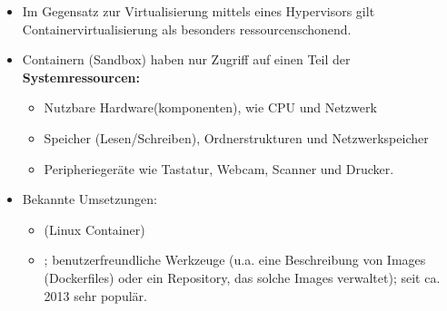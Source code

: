 \begin{itemize}
	\item Im Gegensatz zur Virtualisierung mittels eines Hypervisors gilt Containervirtualisierung als besonders ressourcenschonend.
	\item Containern (Sandbox) haben nur Zugriff auf einen Teil der \textbf{Systemressourcen:}
	\begin{itemize}
		\item Nutzbare Hardware(komponenten), wie CPU und Netzwerk
		\item Speicher (Lesen/Schreiben), Ordnerstrukturen und Netzwerkspeicher
		\item Peripheriegeräte wie Tastatur, Webcam, Scanner und Drucker.
	\end{itemize}
	\item Bekannte Umsetzungen:
	\begin{itemize}
		\item {} (Linux Container)
		\item {}; benutzerfreundliche Werkzeuge (u.a. eine Beschreibung von Images (Dockerfiles) oder ein Repository, das solche Images verwaltet); seit ca. 2013 sehr populär.
	\end{itemize}
\end{itemize}


